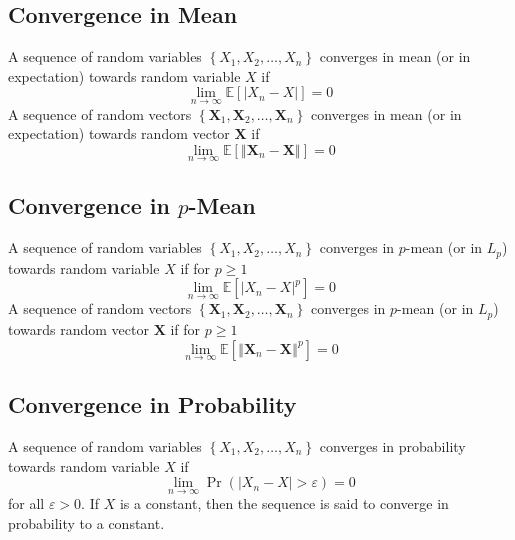 \documentclass[11pt]{report} %
\begin{document}
\subsection{Convergence in Mean}

A sequence of random variables $\left\{X_{1}, X_{2}, \dots, X_{n} \right\}$ converges in mean (or in expectation) towards random variable $X$ if
\begin{equation}
\lim_{n\to\infty}\mathbb{E}\left[\left|X_{n} - X\right|\right] = 0
\end{equation}
A sequence of random vectors $\left\{\mathbf{X}_{1}, \mathbf{X}_{2}, \dots, \mathbf{X}_{n} \right\}$ converges in mean (or in expectation) towards random vector $\mathbf{X}$ if
\begin{equation}
\lim_{n\to\infty}\mathbb{E}\left[\left\Vert\mathbf{X}_{n} - \mathbf{X}\right\Vert\right] = 0
\end{equation}

\subsection{Convergence in $p$-Mean}

A sequence of random variables $\left\{X_{1}, X_{2}, \dots, X_{n} \right\}$ converges in $p$-mean (or in $L_{p}$) towards random variable $X$ if for $p \geq 1$
\begin{equation}
\lim_{n\to\infty}\mathbb{E}\left[\left|X_{n} - X\right|^{p}\right] = 0
\end{equation}
A sequence of random vectors $\left\{\mathbf{X}_{1}, \mathbf{X}_{2}, \dots, \mathbf{X}_{n} \right\}$ converges in $p$-mean (or in $L_{p}$) towards random vector $\mathbf{X}$ if for $p \geq 1$
\begin{equation}
\lim_{n\to\infty}\mathbb{E}\left[\left\Vert\mathbf{X}_{n} - \mathbf{X}\right\Vert^{p}\right] = 0
\end{equation}

\subsection{Convergence in Probability}

A sequence of random variables $\left\{X_{1}, X_{2}, \dots, X_{n} \right\}$ converges in probability towards random variable $X$ if
\begin{equation}
\lim_{n\to \infty}\operatorname{Pr}\left(\left|X_{n} - X\right| > \varepsilon\right) = 0
\end{equation} 
for all $\varepsilon > 0$. If $X$ is a constant, then the sequence is said to converge in probability to a constant.\\
\end{document}
